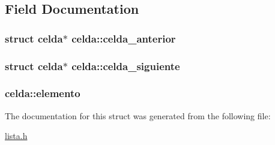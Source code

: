 \subsection{Field Documentation}
\hypertarget{structcelda_a240705efbe1b76882e39896993c42484}{
\subsubsection[{celda\+\_\+anterior}]{\setlength{\rightskip}{0pt plus 5cm}struct {\bf celda}$\ast$ celda\+::celda\+\_\+anterior}}\label{structcelda_a240705efbe1b76882e39896993c42484}
\hypertarget{structcelda_ad7e05643abca9e67556ea588fd1d6ab1}{
\subsubsection[{celda\+\_\+siguiente}]{\setlength{\rightskip}{0pt plus 5cm}struct {\bf celda}$\ast$ celda\+::celda\+\_\+siguiente}}\label{structcelda_ad7e05643abca9e67556ea588fd1d6ab1}
\hypertarget{structcelda_adfe2fa858bb3d3eec2e92de4d5d72cee}{
\subsubsection[{elemento}]{ celda\+::elemento}}\label{structcelda_adfe2fa858bb3d3eec2e92de4d5d72cee}


The documentation for this struct was generated from the following file\+:\begin{DoxyCompactItemize}
\item 
\hyperlink{lista_8h}{lista.\+h}\end{DoxyCompactItemize}
